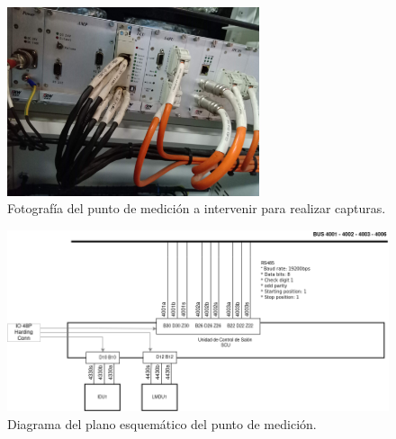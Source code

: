 \documentclass[
11pt, %
]{charter}
\begin{document}
\begin{figure}[htpb]
\centering 
\includegraphics[width=0.66\textwidth]{./Pics/IMG_20210322_122403.jpg}
\caption{Fotografía del punto de medición a intervenir para realizar capturas.}
\label{fig:NOsniffingPhoto}
\end{figure}


\begin{figure}[htpb]
\centering 
\includegraphics[width=1\textwidth]{./Pics/RedPIDS.drawio.png}
\caption{Diagrama del plano esquemático del punto de medición.}
\label{fig:test point SCU-PIDS diagram}
\end{figure}
\end{document}
